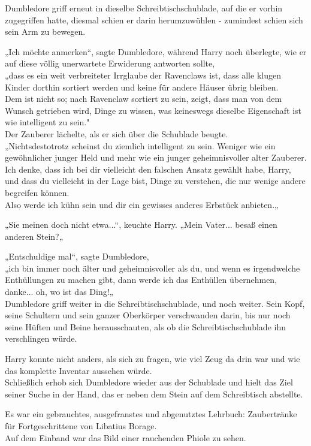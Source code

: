 {Dumbledore griff erneut in dieselbe Schreibtischschublade, auf die er vorhin zugegriffen hatte, diesmal schien er darin herumzuwühlen - zumindest schien sich sein Arm zu bewegen.

„Ich möchte anmerken“, sagte Dumbledore, während Harry noch überlegte, wie er auf diese völlig unerwartete Erwiderung antworten sollte,\\ „dass es ein weit verbreiteter Irrglaube der Ravenclaws ist, dass alle klugen Kinder dorthin sortiert werden und keine für andere Häuser übrig bleiben.\\ Dem ist nicht so; nach Ravenclaw sortiert zu sein, zeigt, dass man von dem Wunsch getrieben wird, Dinge zu wissen, was keineswegs dieselbe Eigenschaft ist wie intelligent zu sein."\\ Der Zauberer lächelte, als er sich über die Schublade beugte.\\ „Nichtsdestotrotz scheinst du ziemlich intelligent zu sein. Weniger wie ein gewöhnlicher junger Held und mehr wie ein junger geheimnisvoller alter Zauberer.\\ Ich denke, dass ich bei dir vielleicht den falschen Ansatz gewählt habe, Harry, und dass du vielleicht in der Lage bist, Dinge zu verstehen, die nur wenige andere begreifen können.\\ Also werde ich kühn sein und dir ein gewisses anderes Erbstück anbieten.„

„Sie meinen doch nicht etwa...“, keuchte Harry. „Mein Vater... besaß einen anderen Stein?„

„Entschuldige mal“, sagte Dumbledore,\\ „ich bin immer noch älter und geheimnisvoller als du, und wenn es irgendwelche Enthüllungen zu machen gibt, dann werde ich das Enthüllen übernehmen, danke... oh, wo ist das Ding!„\\ Dumbledore griff weiter in die Schreibtischschublade, und noch weiter. Sein Kopf, seine Schultern und sein ganzer Oberkörper verschwanden darin, bis nur noch seine Hüften und Beine herausschauten, als ob die Schreibtischschublade ihn verschlingen würde.

Harry konnte nicht anders, als sich zu fragen, wie viel Zeug da drin war und wie das komplette Inventar aussehen würde.\\ Schließlich erhob sich Dumbledore wieder aus der Schublade und hielt das Ziel seiner Suche in der Hand, das er neben dem Stein auf dem Schreibtisch abstellte.

Es war ein gebrauchtes, ausgefranstes und abgenutztes Lehrbuch: Zaubertränke für Fortgeschrittene von Libatius Borage.\\ Auf dem Einband war das Bild einer rauchenden Phiole zu sehen.

}
